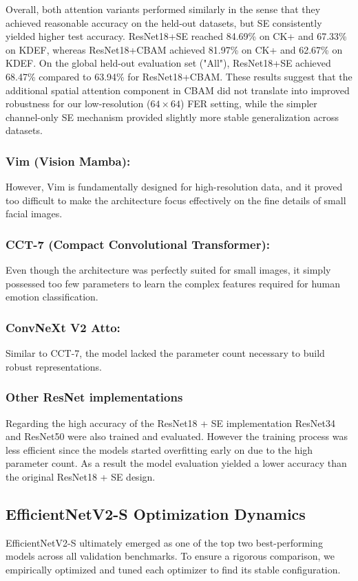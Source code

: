 Overall, both attention variants performed similarly in the sense that they achieved reasonable accuracy on the held-out datasets, but SE consistently yielded higher test accuracy. ResNet18+SE reached 84.69\% on CK+ and 67.33\% on KDEF, whereas ResNet18+CBAM achieved 81.97\% on CK+ and 62.67\% on KDEF. On the global held-out evaluation set ("All"), ResNet18+SE achieved 68.47\% compared to 63.94\% for ResNet18+CBAM. These results suggest that the additional spatial attention component in CBAM did not translate into improved robustness for our low-resolution ($64 \times 64$) FER setting, while the simpler channel-only SE mechanism provided slightly more stable generalization across datasets.

\subsubsection{Vim (Vision Mamba):} However, Vim is fundamentally designed for high-resolution data, and it proved too difficult to make the architecture focus effectively on the fine details of small facial images.
\subsubsection{CCT-7 (Compact Convolutional Transformer):} Even though the architecture was perfectly suited for small images, it simply possessed too few parameters to learn the complex features required for human emotion classification.
\subsubsection{ConvNeXt V2 Atto:} Similar to CCT-7, the model lacked the parameter count necessary to build robust representations.


\subsubsection{Other ResNet implementations}

Regarding the high accuracy of the ResNet18 + SE implementation ResNet34 and ResNet50 were also trained and evaluated. However the training process was less efficient since 
the models started overfitting early on due to the high parameter count. As a result the model evaluation yielded a lower accuracy than the original ResNet18 + SE design.

\subsection{EfficientNetV2-S Optimization Dynamics}
EfficientNetV2-S ultimately emerged as one of the top two best-performing models across all validation benchmarks. To ensure a rigorous comparison, we empirically optimized and tuned each optimizer to find its stable configuration.

